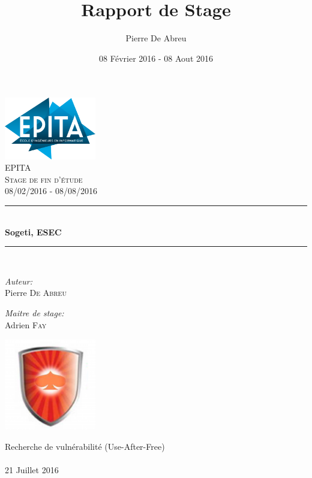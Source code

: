 \documentclass[a4paper, 12pt]{report}
\title{Rapport de Stage}
\author{Pierre De Abreu}
\date{08 Février 2016 - 08 Aout 2016}
\newcommand{\HRule}{\rule{\linewidth}{0.5mm}}
\begin{document}
 
\lstset{language=C++}
\begin{titlepage}
\begin{center}

\includegraphics[width=0.3\textwidth]{epita.png}~\\[1cm]

\textsc{\LARGE EPITA}\\[1.5cm]

\textsc{\Large Stage de fin d'étude}\\[0.5cm]
\textsc{\Large 08/02/2016 - 08/08/2016}

\HRule \\[0.4cm]
{ \huge \bfseries Sogeti, ESEC \\[0.4cm] }

\HRule \\[1.5cm]

\begin{minipage}{0.4\textwidth}
\begin{flushleft} \large
\emph{Auteur:}\\
Pierre \textsc{De Abreu}
\end{flushleft}
\end{minipage}
\begin{minipage}{0.4\textwidth}
\begin{flushright} \large
\emph{Maitre de stage:} \\
Adrien \textsc{Fay}
\end{flushright}
\end{minipage}

\includegraphics[width=0.3\textwidth]{esec.png}~\\[1cm]

\vfill

{\large Recherche de vulnérabilité (Use-After-Free)\paragraph{}}
{\large 21 Juillet 2016}

\end{center}
\end{titlepage}
\end{document}
